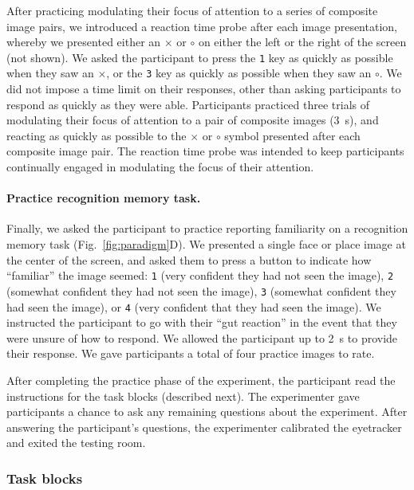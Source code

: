 \documentclass[english]{article}
\begin{document}
After practicing modulating their focus of attention to a series of composite
image pairs, we introduced a reaction time probe after each image presentation,
whereby we presented either an $\times$ or $\circ$ on either the left or the
right of the screen (not shown). We asked the participant to press the
\texttt{1} key as quickly as possible when they saw an $\times$, or the
\texttt{3} key as quickly as possible when they saw an $\circ$. We did not
impose a time limit on their responses, other than asking participants to
respond as quickly as they were able. Participants practiced three trials of
modulating their focus of attention to a pair of composite images (3~s), and
reacting as quickly as possible to the $\times$ or $\circ$ symbol presented
after each composite image pair. The reaction time probe was intended to keep
participants continually engaged in modulating the focus of their attention.

\paragraph{Practice recognition memory task.}

Finally, we asked the participant to practice reporting familiarity on a
recognition memory task (Fig.~\ref{fig:paradigm}D). We presented a single face
or place image at the center of the screen, and asked them to press a button to
indicate how ``familiar'' the image seemed: \texttt{1} (very confident they had
not seen the image), \texttt{2} (somewhat confident they had not seen the
image), \texttt{3} (somewhat confident they had seen the image), or \texttt{4}
(very confident that they had seen the image). We instructed the participant to
go with their ``gut reaction'' in the event that they were unsure of how to
respond. We allowed the participant up to 2~s to provide their response. We
gave participants a total of four practice images to rate.

After completing the practice phase of the experiment, the participant read the
instructions for the task blocks (described next). The experimenter gave
participants a chance to ask any remaining questions about the experiment.
After answering the participant's questions, the experimenter calibrated the
eyetracker and exited the testing room.

\subsubsection*{Task blocks}
\end{document}
